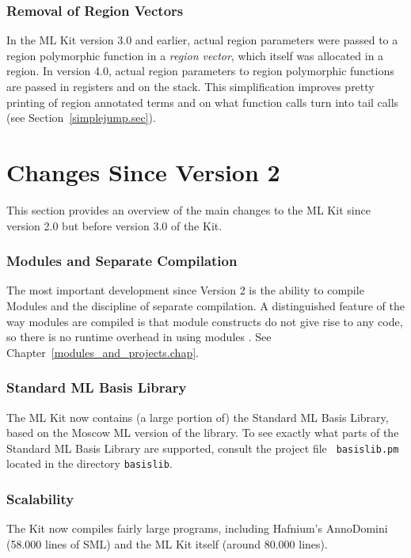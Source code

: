 \documentclass[12pt]{book}
\begin{document}
\subsubsection*{Removal of Region Vectors}
%
In the ML Kit version 3.0 and earlier, actual region parameters were
passed to a region polymorphic function in a {\em region vector},
which itself was allocated in a region. In version 4.0, actual region
parameters to
%
region polymorphic functions are passed in registers and on the stack.
This simplification improves pretty printing of region annotated terms
and on what function calls turn into tail calls (see
Section~\ref{simplejump.sec}).

\section{Changes Since Version 2}
%
This section provides an overview of the main changes to the ML Kit
since version 2.0 but before version 3.0 of the Kit.

\subsubsection*{Modules and Separate Compilation}
The most important development since Version 2 is the ability to
compile Modules and the discipline of separate compilation. A
distinguished feature of the way modules are compiled is that module
constructs do not give rise to any code, so there is no runtime
overhead in using modules \cite{ElsmanICFP99,ElsmanThesis}. See
Chapter~\ref{modules_and_projects.chap}.

\subsubsection*{Standard ML Basis Library}
The ML Kit now contains (a large portion of) the  Standard ML Basis Library, based on the Moscow ML
version of the library. To see exactly what parts of the Standard ML
Basis Library are supported, consult the project file {\tt
  basislib.pm} located in the directory {\tt basislib}.

\subsubsection*{Scalability}
The Kit now compiles fairly large programs, including Hafnium's AnnoDomini
(58.000 lines of SML) and the ML Kit itself (around 80.000 lines).
\end{document}
